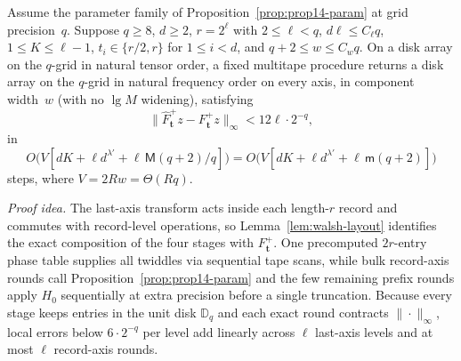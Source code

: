 \begin{theorem}\label{thm:direct-fft}
Assume the parameter family of Proposition~\ref{prop:prop14-param} at grid precision~$q$. Suppose $q\ge8$, $d\ge2$,
$r=2^\ell$ with $2\le\ell<q$, $d\ell\le C_\ell q$, $1\le K\le\ell-1$, $t_i\in\{r/2,r\}$ for $1\le i<d$, and
$q+2\le w\le C_wq$. On a disk array on the $q$-grid in natural tensor order, a fixed multitape procedure returns a disk
array on the $q$-grid in natural frequency order on every axis, in component width~$w$ (with no $\lg M$ widening),
satisfying
\begin{equation}\label{eq:direct-fft-error}
  \|\widehat F^+_{\mathbf t}z-F^+_{\mathbf t}z\|_\infty<12\ell\cdot2^{-q},
\end{equation}
in
\begin{equation}\label{eq:direct-fft-cost}
  O\bigl(V[dK+\ell d^{\lambda'}+\ell\,\mathsf M(q+2)/q]\bigr)
  =O\bigl(V[dK+\ell d^{\lambda'}+\ell\,\mathsf m(q+2)]\bigr)
\end{equation}
steps, where $V=2Rw=\Theta(Rq)$.
\end{theorem}

\emph{Proof idea.} The last-axis transform acts inside each length-$r$ record and commutes with record-level operations,
so Lemma~\ref{lem:walsh-layout} identifies the exact composition of the four stages with $F^+_{\mathbf t}$. One
precomputed $2r$-entry phase table supplies all twiddles via sequential tape scans, while bulk record-axis rounds call
Proposition~\ref{prop:prop14-param} and the few remaining prefix rounds apply $H_0$ sequentially at extra precision
before a single truncation. Because every stage keeps entries in the unit disk $\mathbb D_q$ and each exact round
contracts $\|\cdot\|_\infty$, local errors below $6\cdot 2^{-q}$ per level add linearly across $\ell$ last-axis levels
and at most $\ell$ record-axis rounds.

